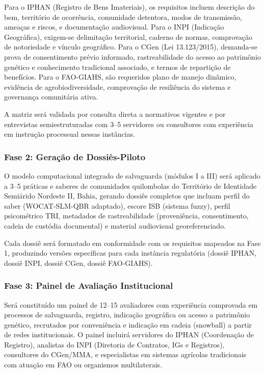 Para o IPHAN (Registro de Bens Imateriais), os requisitos incluem descrição do bem, território de ocorrência, comunidade detentora, modos de transmissão, ameaças e riscos, e documentação audiovisual. Para o INPI (Indicação Geográfica), exigem-se delimitação territorial, caderno de normas, comprovação de notoriedade e vínculo geográfico. Para o CGen (Lei 13.123/2015), demanda-se prova de consentimento prévio informado, rastreabilidade do acesso ao patrimônio genético e conhecimento tradicional associado, e termos de repartição de benefícios. Para o FAO-GIAHS, são requeridos plano de manejo dinâmico, evidência de agrobiodiversidade, comprovação de resiliência do sistema e governança comunitária ativa.

A matriz será validada por consulta direta a normativos vigentes e por entrevistas semiestruturadas com 3--5 servidores ou consultores com experiência em instrução processual nessas instâncias.

\subsubsection{Fase 2: Geração de Dossiês-Piloto}

O modelo computacional integrado de salvaguarda (módulos I a III) será aplicado a 3--5 práticas e saberes de comunidades quilombolas do Território de Identidade Semiárido Nordeste II, Bahia, gerando dossiês completos que incluam perfil do saber (WOCAT-SLM-QBR adaptado), escore ISB (sistema fuzzy), perfil psicométrico TRI, metadados de rastreabilidade (proveniência, consentimento, cadeia de custódia documental) e material audiovisual georeferenciado.

Cada dossiê será formatado em conformidade com os requisitos mapeados na Fase 1, produzindo versões específicas para cada instância regulatória (dossiê IPHAN, dossiê INPI, dossiê CGen, dossiê FAO-GIAHS).

\subsubsection{Fase 3: Painel de Avaliação Institucional}

Será constituído um painel de 12--15 avaliadores com experiência comprovada em processos de salvaguarda, registro, indicação geográfica ou acesso a patrimônio genético, recrutados por conveniência e indicação em cadeia (snowball) a partir de redes institucionais. O painel incluirá servidores do IPHAN (Coordenação de Registro), analistas do INPI (Diretoria de Contratos, IGs e Registros), consultores do CGen/MMA, e especialistas em sistemas agrícolas tradicionais com atuação em FAO ou organismos multilaterais.

